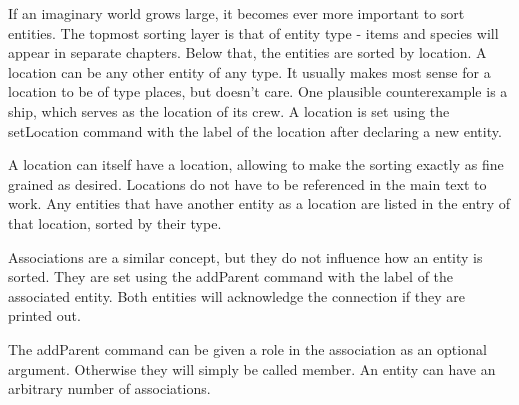 \documentclass[openany]{book}
\begin{document}
If an imaginary world grows large, it becomes ever more important to sort entities. The topmost sorting layer is that of entity type - items and species will appear in separate chapters. Below that, the entities are sorted by location. A location can be any other entity of any type. It usually makes most sense for a location to be of type places, but \RpgTex{} doesn't care. One plausible counterexample is a ship, which serves as the location of its crew. A location is set using the setLocation command with the label of the location after declaring a new entity.

A location can itself have a location, allowing to make the sorting exactly as fine grained as desired. Locations do not have to be referenced in the main text to work. Any entities that have another entity as a location are listed in the entry of that location, sorted by their type.








Associations are a similar concept, but they do not influence how an entity is sorted. They are set using the addParent command with the label of the associated entity. Both entities will acknowledge the connection if they are printed out.

The addParent command can be given a role in the association as an optional argument. Otherwise they will simply be called member. An entity can have an arbitrary number of associations.









\automatedChapters{}
\end{document}
